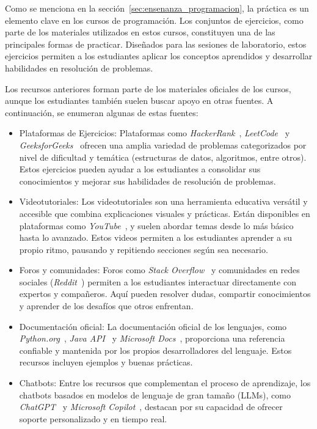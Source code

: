 \documentclass{article}
\begin{document}
Como se menciona en la sección~\ref{sec:ensenanza_programacion}, la práctica es un elemento clave en los cursos de programación. Los conjuntos de ejercicios, como parte de los materiales utilizados en estos cursos, constituyen una de las principales formas de practicar. Diseñados para las sesiones de laboratorio, estos ejercicios permiten a los estudiantes aplicar los conceptos aprendidos y desarrollar habilidades en resolución de problemas.

Los recursos anteriores forman parte de los materiales oficiales de los cursos, aunque los estudiantes también suelen buscar apoyo en otras fuentes. A continuación, se enumeran algunas de estas fuentes:

\begin{itemize}
    \item Plataformas de Ejercicios: 
    Plataformas como \textit{HackerRank}~\cite{hackerrank}, \textit{LeetCode}~\cite{leetcode}  y \textit{GeeksforGeeks}~\cite{geeksforgeeks} ofrecen una amplia variedad de problemas categorizados por nivel de dificultad y temática (estructuras de datos, algoritmos, entre otros). Estos ejercicios pueden ayudar a los estudiantes a consolidar sus conocimientos y mejorar sus habilidades de resolución de problemas.

    \item Videotutoriales:
    Los videotutoriales son una herramienta educativa versátil y accesible que combina explicaciones visuales y prácticas. Están disponibles en plataformas como \textit{YouTube}~\cite{youtube}, y suelen abordar temas desde lo más básico hasta lo avanzado. Estos videos permiten a los estudiantes aprender a su propio ritmo, pausando y repitiendo secciones según sea necesario.

    \item Foros y comunidades: 
    Foros como \textit{Stack Overflow}~\cite{stackoverflow} y comunidades en redes sociales (\textit{Reddit}~\cite{reddit}) permiten a los estudiantes interactuar directamente con expertos y compañeros. Aquí pueden resolver dudas, compartir conocimientos y aprender de los desafíos que otros enfrentan.
    
    \item Documentación oficial:
    La documentación oficial de los lenguajes, como \textit{Python.org}~\cite{python}, \textit{Java API}~\cite{java-api} y \textit{Microsoft Docs}~\cite{microsoft-docs}, proporciona una referencia confiable y mantenida por los propios desarrolladores del lenguaje. Estos recursos incluyen ejemplos y buenas prácticas.
    
    \item Chatbots: 
    Entre los recursos que complementan el proceso de aprendizaje, los chatbots basados en modelos de lenguaje de gran tamaño (LLMs), como \textit{ChatGPT}~\cite{chatgpt} y \textit{Microsoft Copilot}~\cite{copilot}, destacan por su capacidad de ofrecer soporte personalizado y en tiempo real.
\end{itemize}
\end{document}
